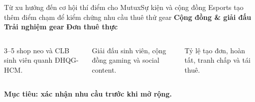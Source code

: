 \begin{frame}{Từ xu hướng đến cơ hội thí điểm cho Mutux}{Sự kiện và cộng đồng Esports tạo thêm điểm chạm để kiểm chứng nhu cầu thuê thử gear}
  \centering
  {\Large\textcolor{mutuxBlue}{\textbf{Cộng đồng \& giải đấu}}}
  \hspace{.8em}{\color{mutuxOrange}\Large$\Longrightarrow$}\hspace{.8em}
  {\Large\textcolor{mutuxBlue}{\textbf{Trải nghiệm gear}}}
  \hspace{.8em}{\color{mutuxOrange}\Large$\Longrightarrow$}\hspace{.8em}
  {\Large\textcolor{mutuxBlue}{\textbf{Đơn thuê thực}}}\par
  \vspace{1.25em}
  \begin{columns}[T,onlytextwidth]
      \par\vspace{.3em}
      3--5 shop neo và CLB sinh viên quanh ĐHQG-HCM.
      \par\vspace{.3em}
      Giải đấu sinh viên, cộng đồng gaming và social content.
      \par\vspace{.3em}
      Tỷ lệ tạo đơn, hoàn tất, tranh chấp và tái thuê.
  \end{columns}
  \vfill
  \centering\textcolor{mutuxOrange}{\textbf{Mục tiêu: xác nhận nhu cầu trước khi mở rộng.}}
\end{frame}

